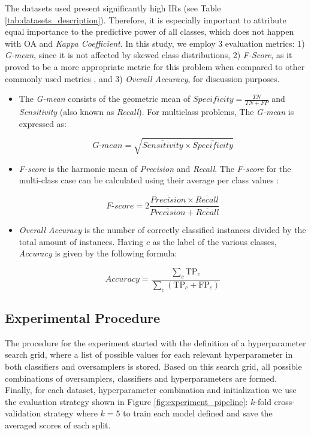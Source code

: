 \documentclass[information,article,submit,moreauthors,pdftex]{Definitions/mdpi}
\begin{document}
\begin{paracol}{2}
The datasets used present significantly high IRs (see Table
\ref{tab:datasets_description}). Therefore, it is especially important to
attribute equal importance to the predictive power of all classes, which does
not happen with OA and \textit{Kappa Coefficient}. In this study, we employ 3
evaluation metrics: 1) \textit{G-mean}, since it is not affected by skewed class
distributions, 2) \textit{F-Score}, as it proved to be a more appropriate metric
for this problem when compared to other commonly used metrics \citep{Jeni2013},
and 3) \textit{Overall Accuracy}, for discussion purposes.

\begin{itemize}
    \item The \textit{G-mean} consists of the geometric mean of $Specificity =
        \frac{TN}{TN + FP}$ and \textit{Sensitivity} (also known as
        \textit{Recall}). For multiclass problems, The \textit{G-mean} is
        expressed as:

        $$\textit{G-mean} = \sqrt{ \overline{Sensitivity} \times
        \overline{Specificity}}$$

    \item \textit{F-score} is the harmonic mean of \textit{Precision} and
        \textit{Recall}. The \textit{F-score} for the multi-class case can be
        calculated using their average per class values \citep{He2009}:

          $$\textit{F-score}=2\frac{\overline{Precision} \times
          \overline{Recall}}{\overline{Precision} + \overline{Recall}}$$

    \item \textit{Overall Accuracy} is the number of correctly classified
        instances divided by the total amount of instances. Having \( c \) as
        the label of the various classes, \textit{Accuracy} is given by the
        following formula:

	      $$\textit{Accuracy} = \frac{ \sum\limits_{c}{ \text{TP}_{c} } }{
			      \sum\limits_{c}{ (\text{TP}_{c}  + \text{FP}_{c}) } } $$

\end{itemize}

\subsection{Experimental Procedure}

The procedure for the experiment started with the definition of a
hyperparameter search grid, where a list of possible values for each relevant
hyperparameter in both classifiers and oversamplers is stored. Based on this
search grid, all possible combinations of oversamplers, classifiers and
hyperparameters are formed.  Finally, for each dataset, hyperparameter
combination and initialization we use the evaluation strategy shown in Figure
\ref{fig:experiment_pipeline}: $k$-fold cross-validation strategy where $k=5$
to train each model defined and save the averaged scores of each split.


\end{paracol}
\end{document}
